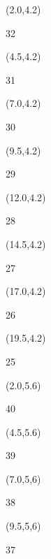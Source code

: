 \documentclass[a4paper]{article}
\newcommand{\myseat}[4]{%
\vspace{-0.1cm} \hspace{-0.5cm}
\parbox[t][2.2cm][t]{3.5cm}{%
\small #1 %
\begin{description}
\vspace{-0.1cm}
\item [ID:] #2
\vspace{-0.1cm}
\item [Team:] #3 \normalsize
\vspace{-0.1cm}
\item \normalsize #4
\vspace{-0.1cm}
\end{description}
}
}
\begin{document}
\begin{textblock}{2.5}(2.0,4.2)
\textblockcolor{}
\myseat{32}{}{}{}
\end{textblock}

\begin{textblock}{2.5}(4.5,4.2)
\textblockcolor{}
\myseat{31}{}{}{}
\end{textblock}

\begin{textblock}{2.5}(7.0,4.2)
\textblockcolor{}
\myseat{30}{}{}{}
\end{textblock}

\begin{textblock}{2.5}(9.5,4.2)
\textblockcolor{}
\myseat{29}{}{}{}
\end{textblock}

\begin{textblock}{2.5}(12.0,4.2)
\textblockcolor{}
\myseat{28}{}{}{}
\end{textblock}

\begin{textblock}{2.5}(14.5,4.2)
\textblockcolor{}
\myseat{27}{}{}{}
\end{textblock}

\begin{textblock}{2.5}(17.0,4.2)
\textblockcolor{}
\myseat{26}{}{}{}
\end{textblock}

\begin{textblock}{2.5}(19.5,4.2)
\textblockcolor{}
\myseat{25}{}{}{}
\end{textblock}


\begin{textblock}{2.5}(2.0,5.6)
\textblockcolor{}
\myseat{40}{}{}{}
\end{textblock}

\begin{textblock}{2.5}(4.5,5.6)
\textblockcolor{}
\myseat{39}{}{}{}
\end{textblock}

\begin{textblock}{2.5}(7.0,5,6)
\textblockcolor{}
\myseat{38}{}{}{}
\end{textblock}

\begin{textblock}{2.5}(9.5,5,6)
\textblockcolor{}
\myseat{37}{}{}{}
\end{textblock}
\end{document}
